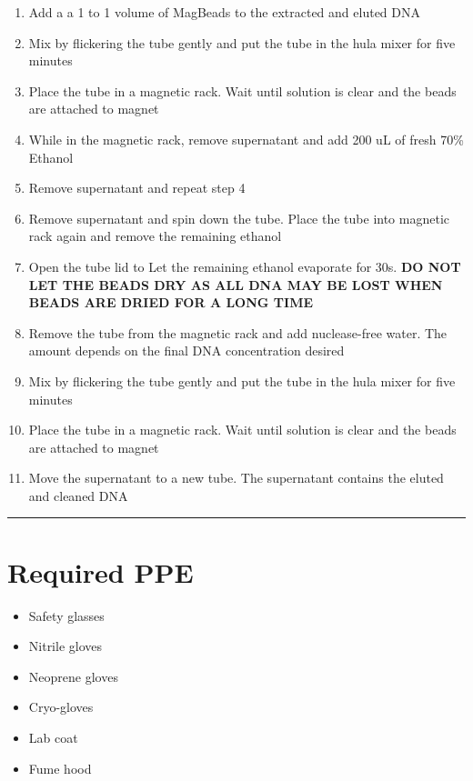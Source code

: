 \documentclass[
]{book}
\begin{document}
\begin{enumerate}
\def\labelenumi{\arabic{enumi}.}
\item
  Add a a 1 to 1 volume of MagBeads to the extracted and eluted DNA
\item
  Mix by flickering the tube gently and put the tube in the hula mixer for five minutes
\item
  Place the tube in a magnetic rack. Wait until solution is clear and the beads are attached to magnet
\item
  While in the magnetic rack, remove supernatant and add 200 uL of fresh 70\% Ethanol
\item
  Remove supernatant and repeat step 4
\item
  Remove supernatant and spin down the tube. Place the tube into magnetic rack again and remove the remaining ethanol
\item
  Open the tube lid to Let the remaining ethanol evaporate for 30s. \textbf{DO NOT LET THE BEADS DRY AS ALL DNA MAY BE LOST WHEN BEADS ARE DRIED FOR A LONG TIME}
\item
  Remove the tube from the magnetic rack and add nuclease-free water. The amount depends on the final DNA concentration desired
\item
  Mix by flickering the tube gently and put the tube in the hula mixer for five minutes
\item
  Place the tube in a magnetic rack. Wait until solution is clear and the beads are attached to magnet
\item
  Move the supernatant to a new tube. The supernatant contains the eluted and cleaned DNA
\end{enumerate}

\begin{center}\rule{0.5\linewidth}{0.5pt}\end{center}

\hypertarget{required-ppe}{%
\section{Required PPE~}\label{required-ppe}}

\begin{itemize}
\item
  Safety glasses~
\item
  Nitrile gloves~
\item
  Neoprene gloves~
\item
  Cryo-gloves~
\item
  Lab coat
\item
  Fume hood~
\end{itemize}
\end{document}
